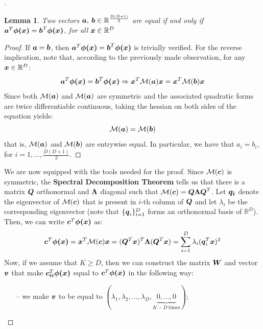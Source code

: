 \documentclass{exam}
\newtheorem{lemma}{Lemma}
\begin{document}
\begin{questions}
\begin{proof}[\unskip\nopunct]
        \begin{lemma}
            Two vectors $\vb*{a}, \: \vb*{b} \in \mathbb{R}^{\frac{D(D + 1)}{2}}$ are equal if and only if $\vb*{a}^T \vb*{\phi(x)} = \vb*{b}^T \vb*{\phi(x)}$, for all $\vb*{x} \in \mathbb{R}^D$
        \end{lemma}
        \begin{proof}
            If $\vb*{a} = \vb*{b}$, then $\vb*{a}^T \vb*{\phi(x)} = \vb*{b}^T \vb*{\phi(x)}$ is trivially verified. For the reverse implication, note that, according to the previously made observation, for any $\vb*{x} \in \mathbb{R}^D$:
            \[
                \vb*{a}^T \vb*{\phi(x)} = \vb*{b}^T \vb*{\phi(x)} \Rightarrow \vb*{x}^T \mathcal{M}(\vb*{a}) \vb*{x} = \vb*{x}^T \mathcal{M}(\vb*{b}) \vb*{x}
            \]
            Since both $\mathcal{M}(\vb*{a})$ and $\mathcal{M}(\vb*{a})$ are symmetric and the associated quadratic forms are twice differentiable continuous, taking the hessian on both sides of the equation yields:
            \[
                \mathcal{M}(\vb*{a}) = \mathcal{M}(\vb*{b})
            \]
            that is, $\mathcal{M}(\vb*{a})$ and $\mathcal{M}(\vb*{b})$ are entrywise equal. In particular, we have that $a_i = b_i$, for $i = 1, \dots, \frac{D(D + 1)}{2}$.
        \end{proof}
        We are now equipped with the tools needed for the proof. Since $\mathcal{M}(\vb*{c})$ is symmetric, the \textbf{Spectral Decomposition Theorem} tells us that there is a matrix $\vb*{Q}$ orthonormal and $\vb*{\Lambda}$ diagonal such that $\mathcal{M}(\vb*{c}) = \vb*{Q} \vb*{\Lambda}\vb*{Q}^T$. Let $\vb*{q_i}$ denote the eigenvector of $\mathcal{M}(\vb*{c})$ that is present in $i$-th column of $\vb*{Q}$ and let $\lambda_i$ be the corresponding eigenvector (note that $\{\vb*{q}_i\}_{i = 1}^{D}$ forms an orthonormal basis of $\mathbb{R}^{D}$). Then, we can write $\vb*{c}^T \vb*{\phi(x)}$ as:
        \[
            \vb*{c}^T \vb*{\phi(x)} =  \vb*{x}^T \mathcal{M}(\vb*{c}) \vb*{x} = (\vb*{Q}^T \vb*{x})^T \vb*{\Lambda} (\vb*{Q}^T \vb*{x}) = \sum_{i = 1}^{D} \lambda_i (\vb*{q}_i^T\vb*{x})^2
        \]
        Now, if we assume that $K \ge D$, then we can construct the matrix $\vb*{W}$ and vector $\vb*{v}$ that make $\vb*{c}^T_{\Theta} \vb*{\phi(x)}$ equal to $\vb*{c}^T \vb*{\phi(x)}$ in the following way:
        \begin{itemize}
            \item[--] we make $\vb*{v}$ to be equal to $(\lambda_1, \lambda_2, \dots, \lambda_D, \underbrace{0, \dots, 0}_{K - D \: \text{times}})$;

\end{itemize}
\end{proof}
\end{questions}
\end{document}

